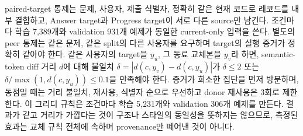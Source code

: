 \documentclass[10pt,conference]{IEEEtran}
\begin{document}
paired-target 통제는 문제, 사용자, 제출 식별자, 정확히 같은 현재 코드로 레코드를 내부 결합하고, Answer target과 Progress target이 서로 다른 source만 남긴다. 조건마다 학습 7,389개와 validation 931개 예제가 동일한 current-only 입력을 쓴다. 별도의 peer 통제는 같은 문제, 같은 split의 다른 사용자를 요구하며 target의 실행 증거가 정확히 같아야 한다. 같은 사용자의 target을 \(y_u\), 그 동료 교체본을 \(y_v\)라 하면, semantic-token diff 거리 \(d\)에 대해 불일치 \(\delta=|d(c,y_v)-d(c,y_u)|\)가 \(\delta\le2\) 또는 \(\delta/\max(1,d(c,y_u))\le0.1\)을 만족해야 한다. 증거가 희소한 집단을 먼저 방문하며, 동점일 때는 거리 불일치, 재사용, 식별자 순으로 우선하고 donor 재사용은 3회로 제한한다. 이 그리디 규칙은 조건마다 학습 5,231개와 validation 306개 예제를 만든다. 결과가 같고 거리가 가깝다는 것이 구조나 스타일의 동일성을 뜻하지는 않으므로, 측정된 효과는 교체 규칙 전체에 속하며 provenance만 떼어낸 것이 아니다.
\end{document}
